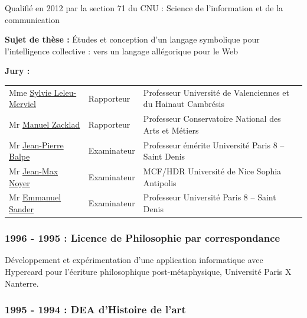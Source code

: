 \documentclass[
  a4paper,
  DIV=11,
  numbers=noendperiod]{scrreprt}
\begin{document}
Qualifié en 2012 par la section 71 du CNU : Science de l'information et
de la communication

\textbf{Sujet de thèse :} Études et conception d'un langage symbolique
pour l'intelligence collective : vers un langage allégorique pour le Web

\textbf{Jury :}

\begin{longtable}[]{@{}
  >{\raggedright\arraybackslash}p{}
  >{\raggedright\arraybackslash}p{}
  >{\raggedright\arraybackslash}p{}@{}}
\toprule\noalign{}
\endhead
\bottomrule\noalign{}
\endlastfoot
Mme \href{http://localhost/samszo/omk/s/fiches/item/61149}{Sylvie
Leleu-Merviel} & Rapporteur & Professeur Université de Valenciennes et
du Hainaut Cambrésis \\
Mr \href{http://localhost/samszo/omk/s/fiches/item/61171}{Manuel
Zacklad} & Rapporteur & Professeur Conservatoire National des Arts et
Métiers \\
Mr \href{http://localhost/samszo/omk/s/fiches/item/61153}{Jean-Pierre
Balpe} & Examinateur & Professeur émérite Université Paris 8 -- Saint
Denis \\
Mr \href{http://localhost/samszo/omk/s/fiches/item/61126}{Jean-Max
Noyer} & Examinateur & MCF/HDR Université de Nice Sophia Antipolis \\
Mr \href{http://localhost/samszo/omk/s/fiches/item/61119}{Emmanuel
Sander} & Examinateur & Professeur Université Paris 8 -- Saint Denis \\
\end{longtable}

\subsubsection*{1996 - 1995 : Licence de Philosophie par
correspondance}\label{sec-item299341}

Développement et expérimentation d'une application informatique avec
Hypercard pour l'écriture philosophique post-métaphysique, Université
Paris X Nanterre.

\subsubsection*{1995 - 1994 : DEA d'Histoire de
l'art}\label{sec-item299342}
\end{document}
